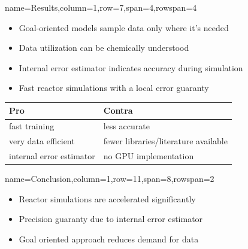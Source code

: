 \documentclass[
	accentcolor=3c,
	boxstyle=colored, %
	colorback=false,
	title=small
	]{tudasciposter}
\begin{document}
\begin{tcbposter}[
	poster={
		columns=8,
		rows=12,
		spacing=1cm,
	},]
\begin{posterboxenv}[title=3. Results]{name=Results,column=1,row=7,span=4,rowspan=4}
	\begin{itemize}
		\item Goal-oriented models sample data only where it's needed
		\item Data utilization can be chemically understood
		\item Internal error estimator indicates accuracy during simulation
		\item Fast reactor simulations with a local error guaranty
	\end{itemize}
	\vspace{2cm}
	\begin{tabularx}{\textwidth}{XX}
		\toprule
		Pro & Contra \\ \midrule
		fast training & less accurate \\ 
		very data efficient & fewer libraries/literature available\\
		internal error estimator & no GPU implementation\\		
		\bottomrule
	\end{tabularx}%
	


\end{posterboxenv}

\begin{posterboxenv}[title=4. Conclusion]{name=Conclusion,column=1,row=11,span=8,rowspan=2}
\begin{multicols}{2}		
	\begin{itemize}
		\item Reactor simulations are accelerated significantly
		\item Precision guaranty due to internal error estimator
		\item Goal oriented approach reduces demand for data
	\end{itemize}
\end{multicols}

\end{posterboxenv}

\end{tcbposter}
\end{document}
